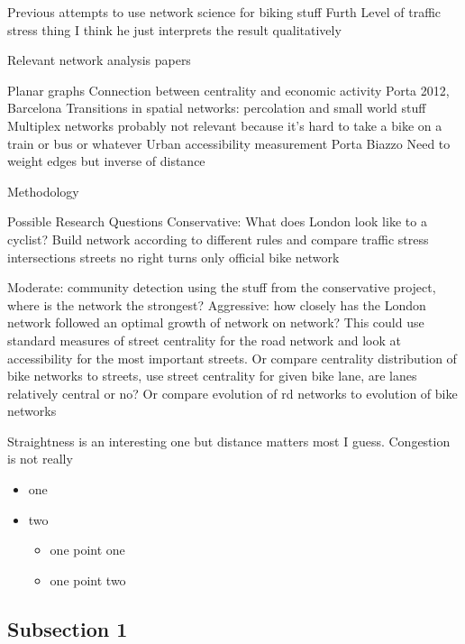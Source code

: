 \documentclass[11pt]{article} %
\begin{document}
	Previous attempts to use network science for biking stuff
		Furth Level of traffic stress thing
			I think he just interprets the result qualitatively
	
	Relevant network analysis papers
		
		Planar graphs
		Connection between centrality and economic activity
			Porta 2012, Barcelona
		Transitions in spatial networks: percolation and small world stuff
		Multiplex networks probably not relevant because it's hard to take a bike on a train or bus or whatever
		Urban accessibility measurement
			Porta 
			Biazzo
			Need to weight edges but inverse of distance
	
	Methodology
	
	

Possible Research Questions
	Conservative: What does London look like to a cyclist? Build network according to different rules and compare
		traffic stress
			intersections
			streets
		no right turns
		only official bike network
		
		
	Moderate: community detection using the stuff from the conservative project, where is the network the strongest?
	Aggressive: how closely has the London network followed an optimal growth of network on network? 
		This could use standard measures of street centrality for the road network and look at accessibility for the most important streets. 
		Or compare centrality distribution of bike networks to streets, use street centrality for given bike lane, are lanes relatively central or no? 
		Or compare evolution of rd networks to evolution of bike networks
		
Straightness is an interesting one but distance matters most I guess. 
Congestion is not really 


	
	


\begin{itemize}
\item one
\item two
  \begin{itemize}
  \item one point one
  \item one point two
  \end{itemize}
\end{itemize}

\subsection{Subsection 1}
\end{document}
